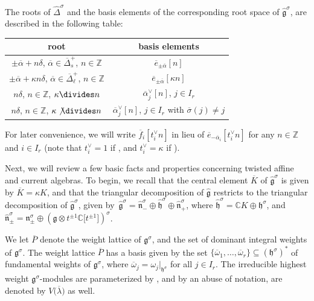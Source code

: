 \documentclass[10pt,a4paper]{amsart}
\numberwithin{equation}{section}
\begin{document}
The roots of $\widehat{\Delta}^{\sigma}$ and the basis elements of the corresponding root space of $\widehat{\mathfrak{g}}^{\sigma}$, are described in the following table:
\begin{center}\renewcommand{\arraystretch}{1.2}
 \begin{tabular}{|c|c|}
 \hline
 root & basis elements \\ \hline
 $\pm\overline{\alpha}+n\delta$, $\overline{\alpha}\in\overline{\Delta}_s^+$, $n\in\mathbb{Z}$ & $\overline{e}_{\pm\overline{\alpha}}[n]$ \\ \hline
 $\pm\overline{\alpha}+\kappa n\delta$, $\overline{\alpha}\in\overline{\Delta}_{\ell}^+$, $n\in\mathbb{Z}$ & $\overline{e}_{\pm\overline{\alpha}}[\kappa n]$ \\ \hline
 $n\delta$, $n\in\mathbb{Z}$, $\kappa\divides n$ & $\overline{\alpha}_j^{\vee}[n]$, $j\in I_r$ \\ \hline
 $n\delta$, $n\in\mathbb{Z}$, $\kappa\not\divides n$ & $\overline{\alpha}_j^{\vee}[n]$, $j\in I_r$ with $\overline{\sigma}(j)\neq j$ \\
 \hline
 \end{tabular}
\end{center}
For later convenience, we will write $\overline{f}_i[t_i^{\vee}n]$ in lieu of $\overline{e}_{-\overline{\alpha}_i}[t_i^{\vee}n]$ for any $n\in\mathbb{Z}$ and $i\in I_r$ \big(note that $t_i^{\vee}=1$ if , and $t_i^{\vee}=\kappa$ if \big).

Next, we will review a few basic facts and properties concerning twisted affine and current algebras. To begin, we recall that the central element $\overline{K}$ of $\widehat{\mathfrak{g}}^{\sigma}$ is given by $\overline{K}=\kappa K$, and that the triangular decomposition of $\widehat{\mathfrak{g}}$ restricts to the triangular decomposition of $\widehat{\mathfrak{g}}^{\sigma}$, given by~${\widehat{\mathfrak{g}}^{\sigma}=\widehat{\mathfrak{n}}_-^{\sigma}\oplus \widehat{\mathfrak{h}}^{\sigma}\oplus \widehat{\mathfrak{n}}_+^{\sigma}}$, where $\widehat{\mathfrak{h}}^{\sigma}= \mathbb{C}K\oplus\mathfrak{h}^{\sigma}$, and $\widehat{\mathfrak{n}}_{\pm}^{\sigma}=\mathfrak{n}_{\pm}^{\sigma} \oplus(\mathfrak{g}\otimes t^{\pm1}\mathbb{C}\bigl[t^{\pm1}\bigr]) ^{\sigma}$.

We let $\overline{P}$ denote the weight lattice of $\mathfrak{g}^{\sigma}$, and  the set of dominant integral weights of $\mathfrak{g}^{\sigma}$. The weight lattice $\overline{P}$ has a basis given by the set $\{\overline{\omega}_1,\dots, \overline{\omega}_r\}\subseteq(\mathfrak{h}^{\sigma})^*$ of fundamental weights of $\mathfrak{g}^{\sigma}$, where $\overline{\omega}_j=\omega_j|_{\mathfrak{h}^{\sigma}}$ for all $j\in I_r$. The irreducible highest weight $\mathfrak{g}^{\sigma}$-modules are parameterized by , and by an abuse of notation, are denoted by $V\bigl(\overline{\lambda}\bigr)$ as well.
\end{document}
